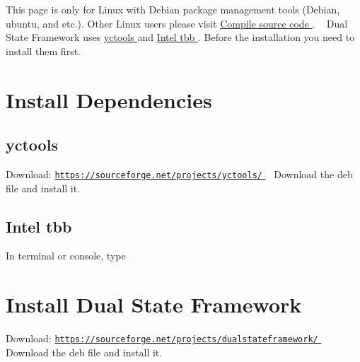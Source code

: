 This page is only for Linux with Debian package management tools (Debian, ubuntu, and etc.). Other Linux users please visit \hyperlink{source}{Compile source code }. ~\newline
 Dual State Framework uses \hyperlink{}{yctools } and \hyperlink{}{Intel tbb }. Before the installation you need to install them first.\hypertarget{_linux_dependencies_linux}{}\section{Install Dependencies}\label{_linux_dependencies_linux}
\hypertarget{_linux_yctools_linux}{}\subsection{yctools}\label{_linux_yctools_linux}
Download\+: \hyperlink{}{\href{https://sourceforge.net/projects/yctools/}{\tt https\+://sourceforge.\+net/projects/yctools/} } ~\newline
 Download the deb file and install it.\hypertarget{_linux_tbb_linux}{}\subsection{Intel tbb}\label{_linux_tbb_linux}
In terminal or console, type 
\hypertarget{_linux_dsf_linux}{}\section{Install Dual State Framework}\label{_linux_dsf_linux}
Download\+: \hyperlink{}{\href{https://sourceforge.net/projects/dualstateframework/}{\tt https\+://sourceforge.\+net/projects/dualstateframework/} } ~\newline
 Download the deb file and install it. 